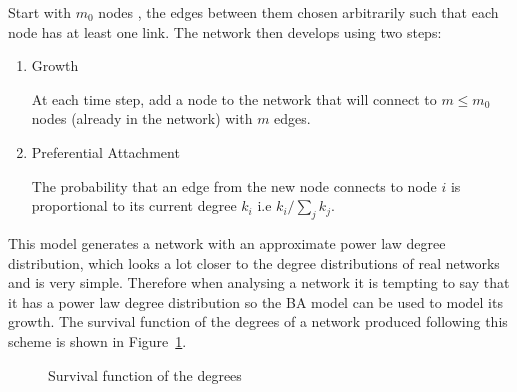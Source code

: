 \documentclass[
]{article}
\begin{document}
Start with \(m_0\) nodes , the edges between them chosen arbitrarily
such that each node has at least one link. The network then develops
using two steps:

\begin{enumerate}
\def\labelenumi{\arabic{enumi}.}
\item
  Growth

  At each time step, add a node to the network that will connect to
  \(m\le m_0\) nodes (already in the network) with \(m\) edges.
\item
  Preferential Attachment

  The probability that an edge from the new node connects to node \(i\)
  is proportional to its current degree \(k_i\) i.e \(k_i/\sum_{j}k_j\).
\end{enumerate}

This model generates a network with an approximate power law degree
distribution, which looks a lot closer to the degree distributions of
real networks and is very simple. Therefore when analysing a network it
is tempting to say that it has a power law degree distribution so the BA
model can be used to model its growth. The survival function of the
degrees of a network produced following this scheme is shown in
Figure~\ref{fig-surv-sim}.

\begin{figure}[H]


\caption{\label{fig-surv-sim}Survival function of the degrees}

\end{figure}%
\end{document}
